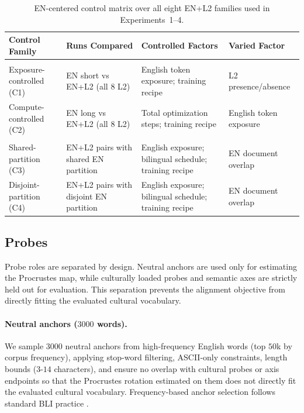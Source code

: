 \documentclass[11pt]{article}
\newcommand{\ENtag}{\textsc{EN}}
\newcommand{\RegimeOne}{Exposure-controlled (C1)}
\newcommand{\RegimeTwo}{Compute-controlled (C2)}
\newcommand{\SetupAName}{Shared-partition (C3)}
\newcommand{\SetupBName}{Disjoint-partition (C4)}
\begin{document}
\begin{table}[t]
\centering
\scriptsize
\setlength{\tabcolsep}{3pt}
\renewcommand{\arraystretch}{1.08}
\begin{tabularx}{\textwidth}{@{}>{\raggedright\arraybackslash}p{}>{\raggedright\arraybackslash}p{}>{\raggedright\arraybackslash}p{}>{\raggedright\arraybackslash}p{}@{}}
\toprule
Control Family & Runs Compared & Controlled Factors & Varied Factor \\
\midrule
\multicolumn{4}{@{}l}{\textbf{Exposure controls}} \\
\cmidrule(lr){1-4}
\RegimeOne & \ENtag{} short vs \textsc{EN+L2} (all 8 L2) & English token exposure; training recipe & L2 presence/absence \\
\RegimeTwo & \ENtag{} long vs \textsc{EN+L2} (all 8 L2) & Total optimization steps; training recipe & English token exposure \\
\cmidrule(lr){1-4}
\multicolumn{4}{@{}l}{\textbf{Overlap controls}} \\
\cmidrule(lr){1-4}
\SetupAName & \textsc{EN+L2} pairs with shared EN partition & English exposure; bilingual schedule; training recipe & EN document overlap \\
\SetupBName & \textsc{EN+L2} pairs with disjoint EN partition & English exposure; bilingual schedule; training recipe & EN document overlap \\
\bottomrule
\end{tabularx}
\caption{EN-centered control matrix over all eight EN+L2 families used in Experiments~1--4.}
\label{tab:run-matrix}
\end{table}

\subsection{Probes}
\label{sec:probes}

Probe roles are separated by design. Neutral anchors are used only for estimating the Procrustes map, while culturally loaded probes and semantic axes are strictly held out for evaluation. This separation prevents the alignment objective from directly fitting the evaluated cultural vocabulary.

\paragraph{Neutral anchors ($3000$ words).} We sample $3000$ neutral anchors from high-frequency English words (top $50$k by corpus frequency), applying stop-word filtering, ASCII-only constraints, length bounds ($3$-$14$ characters), and ensure no overlap with cultural probes or axis endpoints so that the Procrustes rotation estimated on them does not directly fit the evaluated cultural vocabulary. Frequency-based anchor selection follows standard BLI practice \citep{conneau2018word,vulic2020we}.
\end{document}
